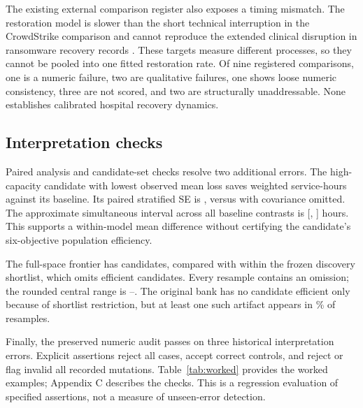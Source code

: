 The existing external comparison register also exposes a timing mismatch.
The restoration model is slower than the short technical interruption in
the CrowdStrike comparison \cite{tully2025} and cannot reproduce the extended
clinical disruption in ransomware recovery records
\cite{hseconti2021}. These targets measure different processes, so they
cannot be pooled into one fitted restoration rate. Of nine registered
comparisons, one is a numeric failure, two are qualitative failures, one
shows loose numeric consistency, three are not scored, and two are
structurally unaddressable. None establishes calibrated hospital recovery
dynamics.

\subsection{Interpretation checks}
Paired analysis and candidate-set checks resolve two additional errors.
The high-capacity candidate with lowest observed mean loss saves
\HighSaving{} weighted service-hours against its baseline. Its paired
stratified SE is \HighPairedSE{}, versus \HighIndependentSE{} with covariance
omitted. The approximate simultaneous interval across all
\ContrastFamily{} baseline contrasts is [\HighLower{}, \HighUpper{}] hours.
This supports a within-model mean difference without certifying the
candidate's six-objective population efficiency.

The full-space frontier has \FullFrontier{} candidates, compared with
\RestrictedFrontier{} within the frozen discovery shortlist, which omits
\OmittedCandidates{} efficient candidates. Every resample contains an
omission; the rounded central range is \OmittedLow{}--\OmittedHigh{}.
The original bank has no candidate efficient only because of shortlist
restriction, but at least one such artifact appears in
\ArtifactPositive{}\% of resamples.

Finally, the preserved numeric audit passes on three historical
interpretation errors. Explicit assertions reject all
\HistoricalContracts{} cases, accept \CorrectContracts{} correct controls,
and reject or flag invalid all \MutationContracts{} recorded mutations.
Table~\ref{tab:worked} provides the worked examples; Appendix C describes the checks. This is a regression
evaluation of specified assertions, not a measure of unseen-error detection.

